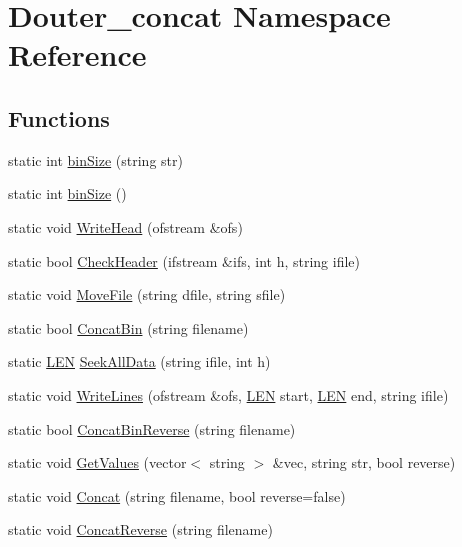 \hypertarget{namespace_douter__concat}{\section{Douter\+\_\+concat Namespace Reference}
\label{namespace_douter__concat}
}
\subsection*{Functions}
\begin{DoxyCompactItemize}
\item 
static int \hyperlink{namespace_douter__concat_ad5a88da78fc32f038112942cc050229a}{bin\+Size} (string str)
\item 
static int \hyperlink{namespace_douter__concat_a9285724679e63cb19699979337517a81}{bin\+Size} ()
\item 
static void \hyperlink{namespace_douter__concat_a4d11def509a5faec6eee9dc701bf7162}{Write\+Head} (ofstream \&ofs)
\item 
static bool \hyperlink{namespace_douter__concat_a8193758a199f8c1b2dbaab322243d939}{Check\+Header} (ifstream \&ifs, int h, string ifile)
\item 
static void \hyperlink{namespace_douter__concat_a489b9b4145e9325aef23c587c29e939d}{Move\+File} (string dfile, string sfile)
\item 
static bool \hyperlink{namespace_douter__concat_a893fb2379796ffd3bb05818f0ef9ebf6}{Concat\+Bin} (string filename)
\item 
static \hyperlink{energy__const_8hh_a05b49c662c073f89e86804f7856622a0}{L\+E\+N} \hyperlink{namespace_douter__concat_a813d0a9403cf1fbf7d90b9a92cf9987f}{Seek\+All\+Data} (string ifile, int h)
\item 
static void \hyperlink{namespace_douter__concat_ab823d0a82704dee70f3136abf7b80d49}{Write\+Lines} (ofstream \&ofs, \hyperlink{energy__const_8hh_a05b49c662c073f89e86804f7856622a0}{L\+E\+N} start, \hyperlink{energy__const_8hh_a05b49c662c073f89e86804f7856622a0}{L\+E\+N} end, string ifile)
\item 
static bool \hyperlink{namespace_douter__concat_adcc0d9bde56ec5d6d73bd33f200b3f99}{Concat\+Bin\+Reverse} (string filename)
\item 
static void \hyperlink{namespace_douter__concat_ab7c6a14da8d315c92d6b73d7bbb42eab}{Get\+Values} (vector$<$ string $>$ \&vec, string str, bool reverse)
\item 
static void \hyperlink{namespace_douter__concat_a263bd0f94dd48039d12ca670533b5709}{Concat} (string filename, bool reverse=false)
\item 
static void \hyperlink{namespace_douter__concat_a9d79d3e99a422f02d168f74c29522af2}{Concat\+Reverse} (string filename)
\end{DoxyCompactItemize}


